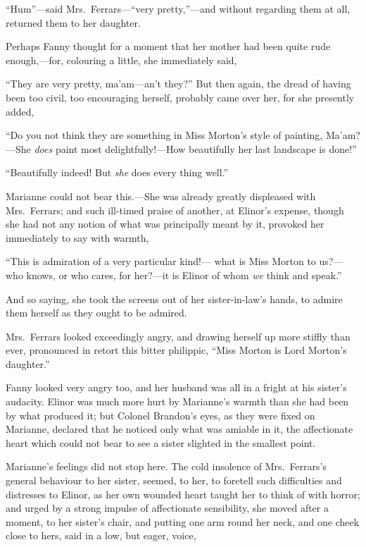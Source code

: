 \documentclass{article}
\begin{document}
``Hum''---said Mrs.\ Ferrars---``very pretty,''---and without
regarding them at all, returned them to her daughter.

Perhaps Fanny thought for a moment that her mother
had been quite rude enough,---for, colouring a little,
she immediately said,

``They are very pretty, ma'am---an't they?'' But then again,
the dread of having been too civil, too encouraging herself,
probably came over her, for she presently added,

``Do you not think they are something in Miss
Morton's style of painting, Ma'am?---She \emph{does} paint most
delightfully!---How beautifully her last landscape is done!''

``Beautifully indeed!  But \emph{she} does every thing well.''

Marianne could not bear this.---She was already
greatly displeased with Mrs.\ Ferrars; and such ill-timed
praise of another, at Elinor's expense, though she
had not any notion of what was principally meant by it,
provoked her immediately to say with warmth,

``This is admiration of a very particular kind!---%
what is Miss Morton to us?---who knows, or who cares,
for her?---it is Elinor of whom \emph{we} think and speak.''

And so saying, she took the screens out of her
sister-in-law's hands, to admire them herself as they
ought to be admired.

Mrs.\ Ferrars looked exceedingly angry, and drawing
herself up more stiffly than ever, pronounced in retort
this bitter philippic, ``Miss Morton is Lord Morton's daughter.''

Fanny looked very angry too, and her husband was
all in a fright at his sister's audacity.  Elinor was
much more hurt by Marianne's warmth than she had been
by what produced it; but Colonel Brandon's eyes, as they
were fixed on Marianne, declared that he noticed only
what was amiable in it, the affectionate heart which could
not bear to see a sister slighted in the smallest point.

Marianne's feelings did not stop here.  The cold
insolence of Mrs.\ Ferrars's general behaviour to her sister,
seemed, to her, to foretell such difficulties and distresses
to Elinor, as her own wounded heart taught her to think
of with horror; and urged by a strong impulse of
affectionate sensibility, she moved after a moment,
to her sister's chair, and putting one arm round her neck,
and one cheek close to hers, said in a low, but eager,
voice,
\end{document}
